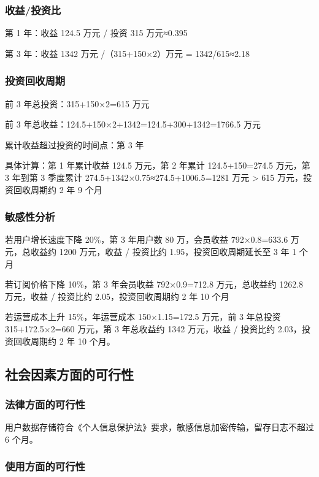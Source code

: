 \documentclass{base}
\begin{document}
\subsubsection{收益/投资比}

第 1 年：收益 124.5 万元 / 投资 315 万元≈0.395

第 3 年：收益 1342 万元 /（315+150×2）万元 = 1342/615≈2.18

\subsubsection{投资回收周期}

前 3 年总投资：315+150×2=615 万元

前 3 年总收益：124.5+150×2+1342=124.5+300+1342=1766.5 万元

累计收益超过投资的时间点：第 3 年

具体计算：第 1 年累计收益 124.5 万元，第 2 年累计 124.5+150=274.5 万元，第 3 年到第 3 季度累计 274.5+1342×0.75≈274.5+1006.5=1281 万元 > 615 万元，投资回收周期约 2 年 9 个月

\subsubsection{敏感性分析}


若用户增长速度下降 20\%，第 3 年用户数 80 万，会员收益 792×0.8=633.6 万元，总收益约 1200 万元，收益 / 投资比约 1.95，投资回收周期延长至 3 年 1 个月

若订阅价格下降 10\%，第 3 年会员收益 792×0.9=712.8 万元，总收益约 1262.8 万元，收益 / 投资比约 2.05，投资回收周期约 2 年 10 个月

若运营成本上升 15\%，年运营成本 150×1.15=172.5 万元，前 3 年总投资 315+172.5×2=660 万元，第 3 年总收益约 1342 万元，收益 / 投资比约 2.03，投资回收周期约 2 年 10 个月。

\subsection{社会因素方面的可行性}

\subsubsection{法律方面的可行性}

用户数据存储符合《个人信息保护法》要求，敏感信息加密传输，留存日志不超过 6 个月。

\subsubsection{使用方面的可行性}
\end{document}
